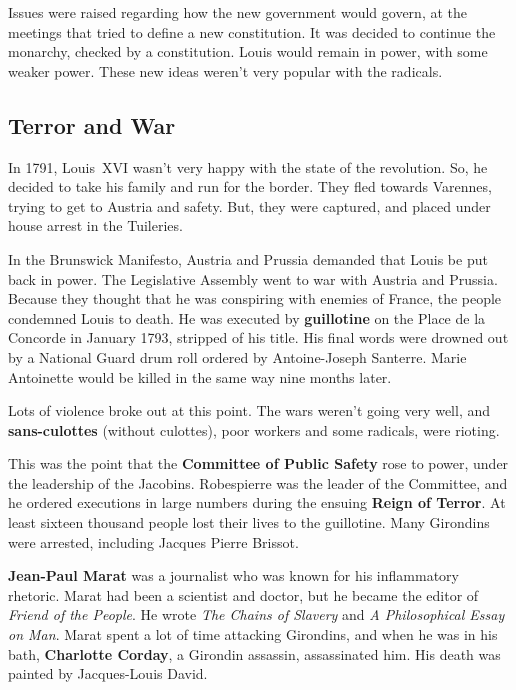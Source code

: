 Issues were raised regarding how the new government would govern,
at the meetings that tried to define a new constitution.
It was decided to continue the monarchy, checked by a constitution.
Louis would remain in power, with some weaker power.
These new ideas weren't very popular with the radicals.

\subsection*{Terror and War}

In 1791, Louis~XVI wasn't very happy with the state of the revolution.
So, he decided to take his family and run for the border.
They fled towards Varennes, trying to get to Austria and safety.
But, they were captured, and placed under house arrest in the Tuileries.

In the Brunswick Manifesto, Austria and Prussia demanded that Louis be put back in power.
The Legislative Assembly went to war with Austria and Prussia.
Because they thought that he was conspiring with enemies of France, the people condemned Louis to death.
He was executed by \textbf{guillotine} on the Place de la Concorde in January 1793, stripped of his title.
His final words were drowned out by a National Guard drum roll ordered by Antoine-Joseph Santerre.
Marie Antoinette would be killed in the same way nine months later.


Lots of violence broke out at this point.
The wars weren't going very well, and \textbf{sans-culottes} (without culottes),
poor workers and some radicals, were rioting.

This was the point that the \textbf{Committee of Public Safety} rose to power,
under the leadership of the Jacobins.
Robespierre was the leader of the Committee,
and he ordered executions in large numbers during the ensuing \textbf{Reign of Terror}.
At least sixteen thousand people lost their lives to the guillotine.
Many Girondins were arrested, including Jacques Pierre Brissot.

\textbf{Jean-Paul Marat} was a journalist who was known for his inflammatory rhetoric.
Marat had been a scientist and doctor, but he became the editor of \textit{Friend of the People}.
He wrote \textit{The Chains of Slavery} and \textit{A Philosophical Essay on Man}.
Marat spent a lot of time attacking Girondins, and when he was in his bath,
\textbf{Charlotte Corday}, a Girondin assassin, assassinated him.
His death was painted by Jacques-Louis David.

